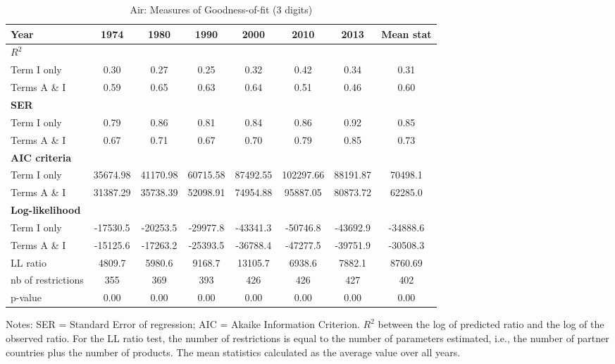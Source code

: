 \documentclass[a4paper,11pt]{article}
\begin{document}
\begin{table}[htbp]
  \centering
  \caption{Air: Measures of Goodness-of-fit (3 digits)}
  \footnotesize{
\begin{center}
    \begin{tabular}{l|cccccc|c}
    \hline \hline
    Year  & 1974  & 1980  & 1990  & 2000  & \multicolumn{1}{c}{2010} & \multicolumn{1}{c}{2013} & Mean stat \\ \hline
    \multicolumn{8}{l}{\bf{$R^2$} }\\ \hline
    Term I only & 0.30  & 0.27  & 0.25  & 0.32  & \multicolumn{1}{c}{0.42} & \multicolumn{1}{c}{0.34} & 0.31 \\
    Terms A \& I & 0.59  & 0.65  & 0.63  & 0.64  & \multicolumn{1}{c}{0.51} & \multicolumn{1}{c}{0.46} & 0.60 \\ \hline
    \multicolumn{8}{l}{\textbf{SER}  }  \\ \hline
    Term I only & 0.79  & 0.86  & 0.81  & 0.84  & \multicolumn{1}{c}{0.86} & \multicolumn{1}{c}{0.92} & 0.85 \\
    Terms A \& I & 0.67  & 0.71  & 0.67  & 0.70  & \multicolumn{1}{c}{0.79} & \multicolumn{1}{c}{0.85} & 0.73 \\ \hline
   \multicolumn{8}{l}{\textbf{AIC criteria}}  \\ \hline
    Term I only & 35674.98 & 41170.98 & 60715.58 & 87492.55 & \multicolumn{1}{c}{102297.66} & \multicolumn{1}{c}{88191.87} & 70498.1 \\
    Terms A \& I & 31387.29 & 35738.39 & 52098.91 & 74954.88 & \multicolumn{1}{c}{95887.05} & \multicolumn{1}{c}{80873.72} & 62285.0 \\ \hline
    \multicolumn{8}{l}{\textbf{Log-likelihood}} \\ \hline
    Term I only & -17530.5 & -20253.5 & -29977.8 & -43341.3 & \multicolumn{1}{c}{-50746.8} & \multicolumn{1}{c}{-43692.9} & -34888.6 \\
    Terms A \& I & -15125.6 & -17263.2 & -25393.5 & -36788.4 & \multicolumn{1}{c}{-47277.5} & \multicolumn{1}{c}{-39751.9} & -30508.3 \\
    LL ratio & 4809.7 & 5980.6 & 9168.7 & 13105.7 & \multicolumn{1}{c}{6938.6} & \multicolumn{1}{c}{7882.1} & 8760.69 \\
    nb of restrictions & 355   & 369   & 393   & 426   & \multicolumn{1}{c}{426} & \multicolumn{1}{c}{427} & 402 \\
    p-value & 0.00 & 0.00 & 0.00 & 0.00 & \multicolumn{1}{c}{0.00} & \multicolumn{1}{c}{0.00} & 0.00 \\
    \hline \hline
 \end{tabular}%
    \end{center}}
  \label{tab:good_fit_air}%
 \parbox[l]{12cm}{\tiny{Notes: SER = Standard Error of regression; AIC = Akaike Information Criterion. $R^{2}$ between the log of predicted ratio and the log of the observed ratio. For the LL ratio test, the number of restrictions is equal to the number of parameters estimated, i.e., the number of partner countries plus the number of products. The mean statistics calculated as the average value over all years. }}
\end{table}%
\end{document}
